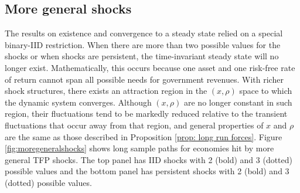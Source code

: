 \documentclass[thmsb,11pt]{article}
\newtheorem{proposition}{Proposition}
\begin{document}
%
%
%
%
%
%
%
%
%
\color{black}
\subsection{More general shocks} \label{Sec: More General Shocks}
The results on existence and convergence to a steady state relied on a special binary-IID restriction. When there are more than two possible values for the shocks or when
shocks are persistent, the time-invariant steady state  will no longer
exist. Mathematically, this occurs because one asset and one risk-free rate
of return cannot span all possible needs for government revenues. With
richer shock structures, there exists an attraction region in the  $(x,\rho)$ space   to which the dynamic
system  converges. Although $\left( x,\rho \right) $ are no longer
constant in such region, their fluctuations tend to be markedly
reduced relative to the transient fluctuations that occur away from that region, and general properties of $x$ and $\rho$ are the same as those
described in Proposition \ref{prop: long run forces}. Figure \ref{fig:moregeneralshocks} shows long sample paths for economies hit by more general TFP shocks. The top panel has IID shocks with 2 (bold) and 3 (dotted) possible values and the bottom panel has persistent shocks with 2 (bold) and 3 (dotted) possible values.
\end{document}
